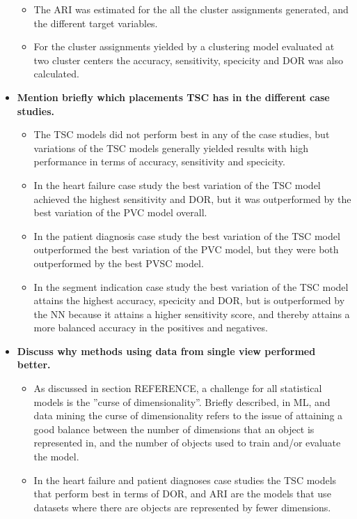 \begin{itemize}
\begin{itemize}
        \item The ARI was estimated for the all the cluster assignments generated, and the different target variables.
        \item For the cluster assignments yielded by a clustering model evaluated at two cluster centers the accuracy, sensitivity, specicity and DOR was also calculated.
    \end{itemize}
    \item \textbf{Mention briefly which placements TSC has in the different case studies.}
    \begin{itemize}
        \item The TSC models did not perform best in any of the case studies, 
              but variations of the TSC models generally yielded results with high performance in terms of accuracy, sensitivity and specicity.
        \item In the heart failure case study the best variation of the TSC model achieved the highest sensitivity and DOR, but it was outperformed by the best variation of the PVC model overall.
        \item In the patient diagnosis case study the best variation of the TSC model outperformed the best variation of the PVC model, but they were both outperformed by the best PVSC model.
        \item In the segment indication case study the best variation of the TSC model attains the highest accuracy, specicity and DOR, 
              but is outperformed by the NN because it attains a higher sensitivity score, and thereby attains a more balanced accuracy in the positives and negatives.
    \end{itemize}
    \item \textbf{Discuss why methods using data from single view performed better.}
    \begin{itemize}
        \item As discussed in section REFERENCE, a challenge for all statistical models is the ''curse of dimensionality''. 
              Briefly described, in ML, and data mining the curse of dimensionality refers to the issue of attaining a good balance 
              between the number of dimensions that an object is represented in, and the number of objects used to train and/or evaluate the model. 
        \item In the heart failure and patient diagnoses case studies the TSC models that perform best in terms of DOR, 
              and ARI are the models that use datasets where there are objects are represented by fewer dimensions.

\end{itemize}
\end{itemize}
